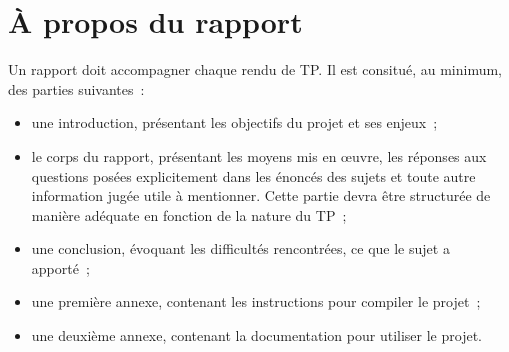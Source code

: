 \documentclass[12pt]{article}
\theoremstyle{definition}
\begin{document}
\section{À propos du rapport}
Un rapport doit accompagner chaque rendu de TP. Il est consitué, au 
minimum, des parties suivantes~:
\begin{itemize}
    \item une introduction, présentant les objectifs du projet et ses 
    enjeux~;
    \smallskip
    
    \item le corps du rapport, présentant les moyens mis en \oe uvre,
    les réponses aux questions posées explicitement dans les énoncés des 
    sujets et toute autre information jugée utile à mentionner. Cette
    partie devra être structurée de manière adéquate en fonction de la
    nature du TP~;
    \smallskip
    
    \item une conclusion, évoquant les difficultés rencontrées, ce que 
    le sujet a apporté~;
    \smallskip
    
    \item une première annexe, contenant les instructions pour compiler
    le projet~;
    \smallskip
    
    \item une deuxième annexe, contenant la documentation pour utiliser 
    le projet.
\end{itemize}
\medskip

\end{document}
